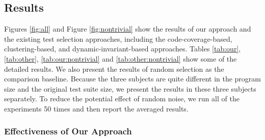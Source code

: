 \documentclass{sig-alternate}
\begin{document}
\subsection{Results}

Figures \ref{fig:all} and Figure \ref{fig:nontrivial} show the
results of our approach and the existing test selection approaches,
including the code-coverage-based, clustering-based, and
dynamic-invariant-based approaches. Tables \ref{tab:our},
\ref{tab:other}, \ref{tab:our:nontrivial} and
\ref{tab:other:nontrivial} show some of the detailed results. We
also present the results of random selection as the comparison
baseline. Because the three subjects are quite different in the
program size and the original test suite size, we present the
results in these three subjects separately. To reduce the potential
effect of random noise, we run all of the experiments 50 times and
then report the averaged results.

\vspace{-0.1in}

\subsubsection{Effectiveness of Our Approach}
\end{document}
